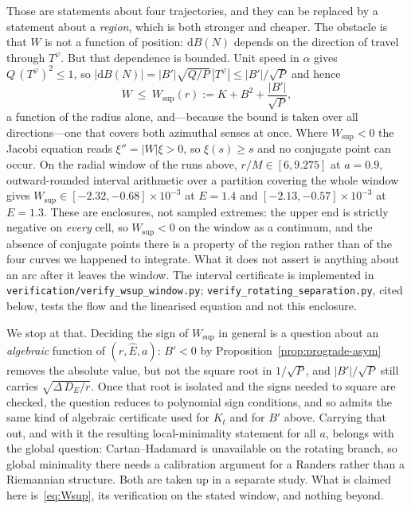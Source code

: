 \documentclass[12pt]{iopart}
\theoremstyle{plain}
\theoremstyle{definition}
\theoremstyle{remark}
\newcommand{\Ehat}{\hat E}
\newcommand{\dd}{\mathrm{d}}
\begin{document}
Those are statements about four trajectories, and they can be replaced by a
statement about a \emph{region}, which is both stronger and cheaper. The obstacle
is that $W$ is not a function of position: $\dd B(N)$ depends on the direction of
travel through $T^\varphi$. But that dependence is bounded. Unit speed in $\alpha$
gives $Q\,(T^\varphi)^2\le1$, so $|\dd B(N)|=|B'|\sqrt{Q/P}\,|T^\varphi|\le|B'|/\sqrt P$
and hence
\begin{equation}
    W\ \le\ W_{\sup}(r):=K+B^2+\frac{|B'|}{\sqrt P} ,
    \label{eq:Wsup}
\end{equation}
a function of the radius alone, and---because the bound is taken over all
directions---one that covers both azimuthal senses at once. Where $W_{\sup}<0$ the
Jacobi equation reads $\xi''=|W|\xi>0$, so $\xi(s)\ge s$ and no conjugate point can
occur. On the radial window of the runs above, $r/M\in[6,9.275]$ at $a=0.9$,
outward-rounded interval arithmetic over a partition covering the whole window
gives $W_{\sup}\in[-2.32,-0.68]\times10^{-3}$ at $E=1.4$ and
$[-2.13,-0.57]\times10^{-3}$ at $E=1.3$. These are enclosures, not sampled
extremes: the upper end is strictly negative on \emph{every} cell, so
$W_{\sup}<0$ on the window as a continuum, and the absence of conjugate points
there is a property of the region rather than of the four curves we happened to
integrate. What it does not assert is anything about an arc after it leaves the
window. The interval certificate is implemented in
\texttt{verification/verify\_wsup\_window.py}; \texttt{verify\_rotating\_separation.py},
cited below, tests the flow and the linearised equation and not this enclosure.

We stop at that. Deciding the sign of $W_{\sup}$ in general is a question about an
\emph{algebraic} function of $(r,\Ehat,a)$: $B'<0$ by
Proposition~\ref{prop:prograde-asym} removes the absolute value, but not the square root
in $1/\sqrt P$, and $|B'|/\sqrt P$ still carries $\sqrt{\Delta\,D_E/r}$. Once that root is
isolated and the signs needed to square are checked, the question reduces to polynomial
sign conditions, and so admits the same kind of algebraic certificate used for $K_t$ and
for $B'$ above. Carrying that out, and
with it the resulting local-minimality statement for all $a$, belongs with the
global question: Cartan--Hadamard is unavailable on the rotating branch, so global
minimality there needs a calibration argument for a Randers rather than a
Riemannian structure. Both are taken up in a separate study. What is claimed here
is~\eqref{eq:Wsup}, its verification on the stated window, and nothing beyond.
\end{document}
